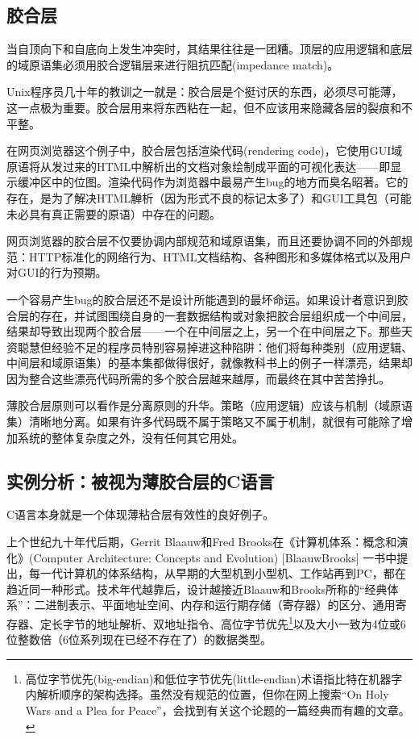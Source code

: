 \documentclass[12pt,oneside]{book}
\begin{document}
\begin{common-format}
\subsection{胶合层}
当自顶向下和自底向上发生冲突时，其结果往往是一团糟。顶层的应用逻辑和底层的域原语集必须用胶合逻辑层来进行阻抗匹配(impedance match)。

Unix程序员几十年的教训之一就是：胶合层是个挺讨厌的东西，必须尽可能薄，这一点极为重要。胶合层用来将东西粘在一起，但不应该用来隐藏各层的裂痕和不平整。

在网页浏览器这个例子中，胶合层包括渲染代码(rendering code)，它使用GUI域原语将从发过来的HTML中解析出的文档对象绘制成平面的可视化表达——即显示缓冲区中的位图。渲染代码作为浏览器中最易产生bug的地方而臭名昭著。它的存在，是为了解决HTML觯析（因为形式不良的标记太多了）和GUI工具包（可能未必具有真正需要的原语）中存在的问题。

网页浏览器的胶合层不仅要协调内部规范和域原语集，而且还要协调不同的外部规范：HTTP标准化的网络行为、HTML文档结构、各种图形和多媒体格式以及用户对GUI的行为预期。

一个容易产生bug的胶合层还不是设计所能遇到的最坏命运。如果设计者意识到胶合层的存在，并试图围绕自身的一套数据结构或对象把胶合层组织成一个中间层，结果却导致出现两个胶合层——一个在中间层之上，另一个在中间层之下。那些天资聪慧但经验不足的程序员特别容易掉进这种陷阱：他们将每种类别（应用逻辑、中间层和域原语集）的基本集都做得很好，就像教科书上的例子一样漂亮，结果却因为整合这些漂亮代码所需的多个胶合层越来越厚，而最终在其中苦苦挣扎。

薄胶合层原则可以看作是分离原则的升华。策略（应用逻辑）应该与机制（域原语集）清晰地分离。如果有许多代码既不属于策略又不属于机制，就很有可能除了增加系统的整体复杂度之外，没有任何其它用处。


\subsection{实例分析：被视为薄胶合层的C语言}
C语言本身就是一个体现薄粘合层有效性的良好例子。

上个世纪九十年代后期，Gerrit Blaauw和Fred Brooks在《计算机体系：概念和演化》(Computer Architecture:  Concepts and Evolution)  [BlaauwBrooks] 一书中提出，每一代计算机的体系结构，从早期的大型机到小型机、工作站再到PC，都在趋近同一种形式。技术年代越靠后，设计越接近Blaauw和Brooks所称的“经典体系”：二进制表示、平面地址空间、内存和运行期存储（寄存器）的区分、通用寄存器、定长字节的地址解析、双地址指令、高位字节优先\footnote{高位字节优先(big-endian)和低位字节优先(little-endian)术语指比特在机器字内解析顺序的架构选择。虽然没有规范的位置，但你在网上搜索“On Holy Wars and a Plea for Peace”，会找到有关这个论题的一篇经典而有趣的文章。}以及大小一致为4位或6位整数倍（6位系列现在已经不存在了）的数据类型。


\end{common-format}
\end{document}
